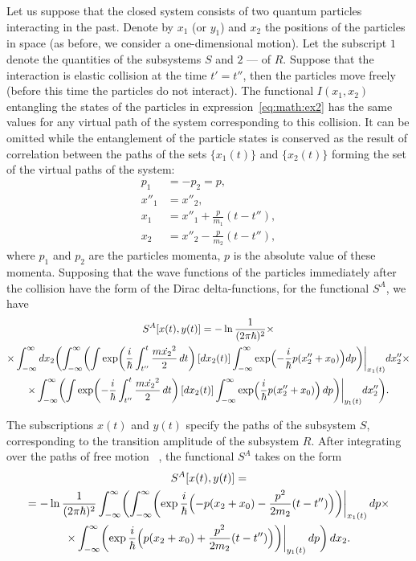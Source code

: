 Let us suppose that the closed system consists of two quantum particles interacting in the past. Denote by $x_1$ (or $y_1$) and $x_2$ the positions of the particles in space (as before, we consider a one-dimensional motion). Let the subscript $1$ denote the quantities of the subsystems $S$ and $2$ --- of $R$. Suppose that the interaction is elastic collision at the time $t'=t''$, then the particles move freely (before this time the particles do not interact). The functional $I(x_1,x_2)$ entangling the states of the particles in expression~\eqref{eq:math:ex2} has the same values for any virtual path of the system corresponding to this collision. It can be omitted while the entanglement of the particle states is conserved as the result of correlation between the paths of the sets $\{x_1(t)\}$ and $\{x_2(t)\}$ forming the set of the virtual paths of the system:
\begin{equation}\label{eq:math:ex4}
\begin{aligned}
p_1&=-p_2=p,\\
x''_1&=x''_2,\\
x_1&=x''_1+\frac{p}{m_1}(t-t''),\\
x_2&=x''_2-\frac{p}{m_2}(t-t''),
\end{aligned}
\end{equation}
where $p_1$ and $p_2$ are the particles momenta, $p$ is the absolute value of these momenta. Supposing that the wave functions of the particles immediately after the collision have the form of the Dirac delta-functions, for the functional $S^A$, we have {\small
\begin{multline*}
 S^A[x(t),y(t)]=-\ln\frac{1}{(2\pi\hbar)^2}\times
 \\
 \times\int _{-\infty}^{\infty}dx_2\biggl(\int _{-\infty}^{\infty}
 \biggl(\int\exp\biggl(\frac{i}{\hbar}\int _{t''}^{t}\frac{m\dot{x_2}^2}{2}\,dt\biggr)\,[dx_2(t)]\int _{-\infty}^{\infty}\exp\Bigl(-\frac{i}{\hbar}p(x''_2+x_0)\Bigr)dp\biggr)\biggr|_{x_1(t)}dx''_2 \times \\
 \times\int _{-\infty}^{\infty}\biggl(\int\exp\biggl(-\frac{i}{\hbar}\int _{t''}^{t}\frac{m\dot{x_2}^2}{2}\,dt\biggr)\,[dx_2(t)]\int _{-\infty}^{\infty}\exp\Bigl(\frac{i}{\hbar}p(x''_2+x_0)\Bigr)\,dp\biggr)\biggr|_{y_1(t)}dx''_2 \biggr).
\end{multline*} }


The subscriptions $x(t)$ and $y(t)$ specify the paths of the subsystem $S$, corresponding to the transition amplitude of the subsystem $R$. After integrating over the paths of free motion ~\cite{bib:7,bib:12}, the functional $S^A$ takes on the form  
\begin{multline*}
 S^A[x(t),y(t)]=\nonumber\\=-\ln\frac{1}{(2\pi\hbar)^2}\int _{-\infty}^{\infty}\biggl(\int _{-\infty}^{\infty}\biggl(\exp\frac{i}{\hbar}\Bigl(-p(x_2+x_0)-\frac{p^2}{2m_2}(t-t'')\Bigr)\biggr)\biggr|_{x_1(t)}\,dp\times\nonumber\\\times\int _{-\infty}^{\infty}\biggl(\exp\frac{i}{\hbar}\Bigl(p(x_2+x_0)+\frac{p^2}{2m_2}(t-t'')\Bigr)\biggr)\biggr|_{y_1(t)}\,dp\biggr)\,dx_2.
\end{multline*}

